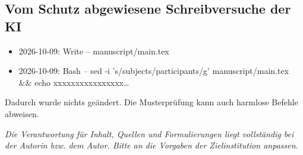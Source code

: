 \subsection*{Vom Schutz abgewiesene Schreibversuche der KI}
\begin{itemize}
  \item 2026-10-09: Write – manuscript/main.tex
  \item 2026-10-09: Bash – sed -i 's/subjects/participants/g' manuscript/main.tex \&\& echo xxxxxxxxxxxxxxxx…
\end{itemize}
Dadurch wurde nichts geändert. Die Musterprüfung kann auch harmlose Befehle abweisen.

\textit{Die Verantwortung für Inhalt, Quellen und Formulierungen liegt vollständig bei der Autorin bzw. dem Autor. Bitte an die Vorgaben der Zielinstitution anpassen.}

